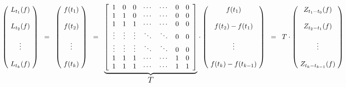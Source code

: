 \begin{equation*}
	\left(\!
	\begin{array}{c}
	L_{t_{1}}(f) \\ \\ L_{t_{2}}(f) \\ \\ \vdots \\ \\ L_{t_{k}}(f) 
	\end{array}
	\!\right)
	\;\; = \;\;
	\left(\!
	\begin{array}{c}
	f(t_{1}) \\ \\ f(t_{2}) \\ \\ \vdots \\ \\ f(t_{k}) 
	\end{array}
	\!\right)
	\;\; = \;\;
	\underset{\textnormal{\large$T$}}{\underbrace{
	\left[
	\begin{array}{ccccccc}
	1 & 0 & 0 & \cdots & \cdots & 0 & 0 \\
	1 & 1 & 0 & \cdots & \cdots & 0 & 0 \\
	1 & 1 & 1 & \cdots & \cdots & 0 & 0 \\
	\vdots & \vdots & \vdots & \ddots & \ddots & 0 & 0 \\
	\vdots & \vdots & \vdots & \ddots & \ddots & 0 & 0 \\
	1 & 1 & 1 & \cdots & \cdots & 1 & 0 \\
	1 & 1 & 1 & \cdots & \cdots & 1 & 1 \\
	\end{array}
	\right]
	}}
	\cdot
	\left(\!
	\begin{array}{c}
	f(t_{1}) \\ \\ f(t_{2}) - f(t_{1}) \\ \\ \vdots \\ \\ f(t_{k}) - f(t_{k-1})
	\end{array}
	\!\right)
	\;\; = \;\;
	T \cdot
	\left(\!
	\begin{array}{c}
	Z_{t_{1}-t_{0}}(f) \\ \\ Z_{t_{2}-t_{1}}(f) \\ \\ \vdots \\ \\ Z_{t_{k}-t_{k-1}}(f)
	\end{array}
	\!\right)
\end{equation*}

